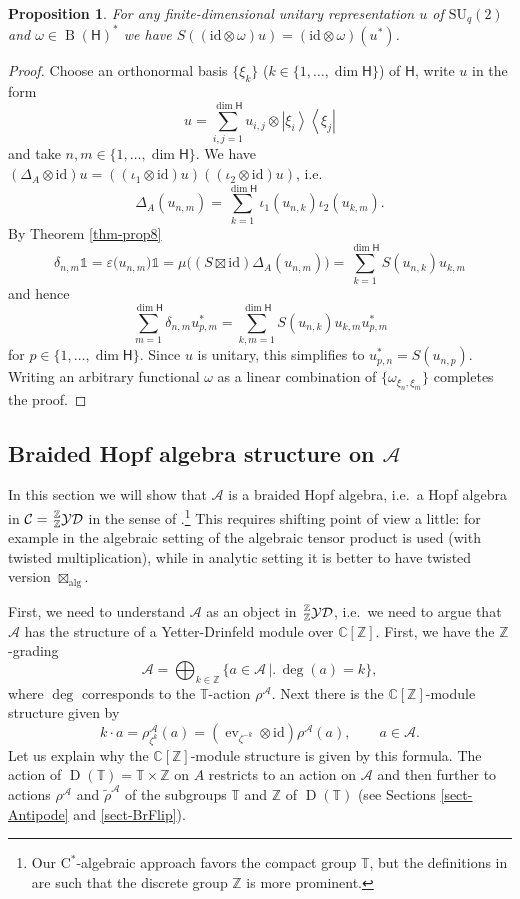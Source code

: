\documentclass[12pt,reqno,a4paper]{amsart}
\newtheorem{proposition}{Proposition}[section]
\theoremstyle{definition}
\newcommand{\cst}{\ensuremath{\mathrm{C}^*}}
\newcommand{\eps}{\varepsilon}
\newcommand{\I}{\mathds{1}}
\newcommand{\id}{\mathrm{id}}
\newcommand{\ket}[1]{{\left|#1\right\rangle}}
\newcommand{\bra}[1]{{\left\langle#1\right|}}
\newcommand{\tens}{\otimes}
\newcommand{\algboxtimes}{\boxtimes_{\textrm{alg}}}
\newcommand{\CC}{\mathbb{C}}
\newcommand{\TT}{\mathbb{T}}
\newcommand{\ZZ}{\mathbb{Z}}
\newcommand{\cA}{\mathscr{A}}
\newcommand{\sH}{\mathsf{H}}
\DeclareMathOperator{\B}{B}
\DeclareMathOperator{\D}{D}
\newcommand{\SU}{\mathrm{SU}}
\numberwithin{equation}{section}
\begin{document}
\begin{proposition}\label{propprop5}
For any finite-dimensional unitary representation $u$ of $\SU_q(2)$ and
$\omega\in\B(\sH)^*$ we have $S((\id\tens\omega)u)=(\id\tens\omega)(u^*)$.
\end{proposition}

\begin{proof}
Choose an orthonormal basis $\{\xi_k\}$ ($k\in\{1,\dotsc,\dim{\sH}\}$) of $\sH$, write $u$ in the form
\[
u=\sum_{i,j=1}^{\dim{\sH}}u_{i,j}\tens \ket{\xi_i}\bra{\xi_j}
\]
and take $n,m\in\{1,\dotsc,\dim{\sH}\}$. We have $(\Delta_A\tens\id)u=((\iota_1\tens\id)u)((\iota_2\tens\id)u)$, i.e.
\[
\Delta_A(u_{n,m})
=\sum_{k=1}^{\dim{\sH}}\iota_1(u_{n,k})\iota_2(u_{k,m}).
\]
By Theorem \ref{thm-prop8}
\[
\delta_{n,m}\I
=\eps\bigl(u_{n,m})\I
=\mu\bigl((S\boxtimes\id)\Delta_A(u_{n,m})\bigr)
=\sum_{k=1}^{\dim{\sH}}S(u_{n,k})u_{k,m}
\]
and hence
\[
\sum_{m=1}^{\dim{\sH}}\delta_{n,m}u_{p,m}^*
=\sum_{k,m=1}^{\dim{\sH}}S(u_{n,k})u_{k,m}u_{p,m}^*
\]
for $p\in\{1,\dotsc,\dim{\sH}\}$. Since $u$ is unitary, this simplifies to $u_{p,n}^*=S(u_{n,p})$. Writing an arbitrary functional $\omega$ as a linear combination of $\{\omega_{\xi_n,\xi_m}\}$ completes the proof.
\end{proof}


\subsection{Braided Hopf algebra structure on \texorpdfstring{$\cA$}{A}}\label{sect-BrHopf}

In this section we will show that $\cA$ is a braided Hopf algebra, i.e.~a Hopf algebra in $\mathcal{C}=\sideset{_\ZZ^\ZZ}{}{\operatorname{\mathcal{YD}}}$ in the sense of \cite[Definition 1.6.6]{HeckenbergerSchneider}.\footnote{Our \cst-algebraic approach favors the compact group $\TT$, but the definitions in \cite{HeckenbergerSchneider} are such that the discrete group $\ZZ$ is more prominent.}
This requires shifting point of view a little: for example in the algebraic setting of \cite{HeckenbergerSchneider} the algebraic tensor product is used (with twisted multiplication), while in analytic setting it is better to have twisted version $\algboxtimes$.

First, we need to understand $\cA$ as an object in $\sideset{_\ZZ^\ZZ}{}{\operatorname{\mathcal{YD}}}$, i.e.~we need to argue that $\cA$ has the structure of a Yetter-Drinfeld module over $\CC[\ZZ]$. First, we have the $\ZZ$-grading
\[
\cA=\bigoplus_{k\in\ZZ}
\bigl\{a\in\cA\,\bigr|\bigl.\,\deg(a)=k\bigr\},
\]
where $\deg$ corresponds to the $\TT$-action $\rho^\cA$. Next there is the $\CC[\ZZ]$-module structure given by
\[
k\cdot a=\rho^\cA_{\zeta^{k}}(a)
=(\operatorname{ev}_{\zeta^{-k}}\tens\id)\rho^\cA(a),\qquad a\in\cA.
\]
Let us explain why the $\CC[\ZZ]$-module structure is given by this formula. The action of $\D(\TT)=\TT\times\ZZ$ on $A$ restricts to an action on $\cA$ and then further to actions $\rho^\cA$ and $\tilde{\rho}^\cA$ of the subgroups $\TT$ and $\ZZ$ of $\D(\TT)$ (see Sections \ref{sect-Antipode} and \ref{sect-BrFlip}).
\end{document}
